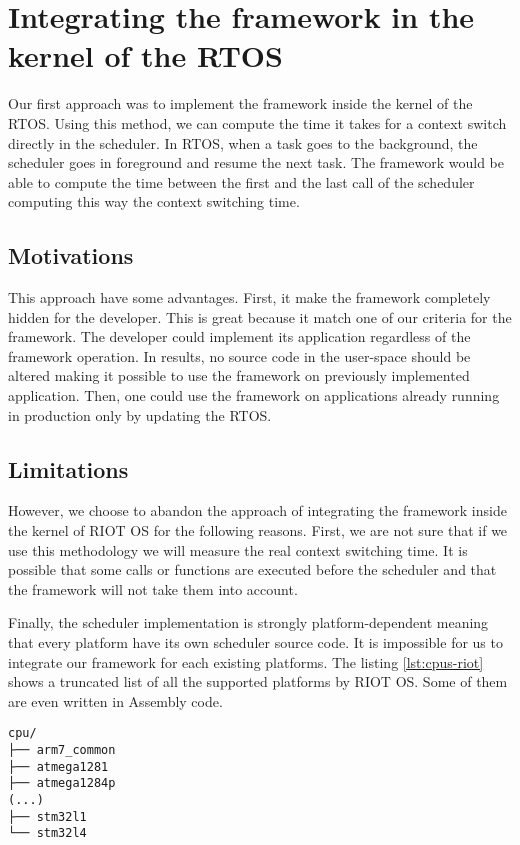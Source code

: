 \section{Integrating the framework in the kernel of the RTOS \label{sec:kernel}}

Our first approach was to implement the framework inside the kernel of the RTOS.
Using this method, we can compute the time it takes for a context switch directly in the scheduler.
In RTOS, when a task goes to the background, the scheduler goes in foreground and resume the next task.
The framework would be able to compute the time between the first and the last call of the scheduler computing this way the context switching time.

\subsection{Motivations}

This approach have some advantages.
First, it make the framework completely hidden for the developer.
This is great because it match one of our criteria for the framework.
The developer could implement its application regardless of the framework operation.
In results, no source code in the user-space should be altered making it possible to use the framework on previously implemented application.
Then, one could use the framework on applications already running in production only by updating the RTOS.

\subsection{Limitations}

However, we choose to abandon the approach of integrating the framework inside the kernel of RIOT OS for the following reasons.
First, we are not sure that if we use this methodology we will measure the real context switching time.
It is possible that some calls or functions are executed before the scheduler and that the framework will not take them into account.

Finally, the scheduler implementation is strongly platform-dependent meaning that every platform have its own scheduler source code.
It is impossible for us to integrate our framework for each existing platforms.
The listing \ref{lst:cpus-riot} shows a truncated list of all the supported platforms by RIOT OS.
Some of them are even written in Assembly code.

\begin{lstlisting}[style=ascii-tree, label={lst:cpus-riot}, caption={Truncated list of platforms supported by RIOT OS}]
cpu/
├── arm7_common
├── atmega1281
├── atmega1284p
(...)
├── stm32l1
└── stm32l4
\end{lstlisting}